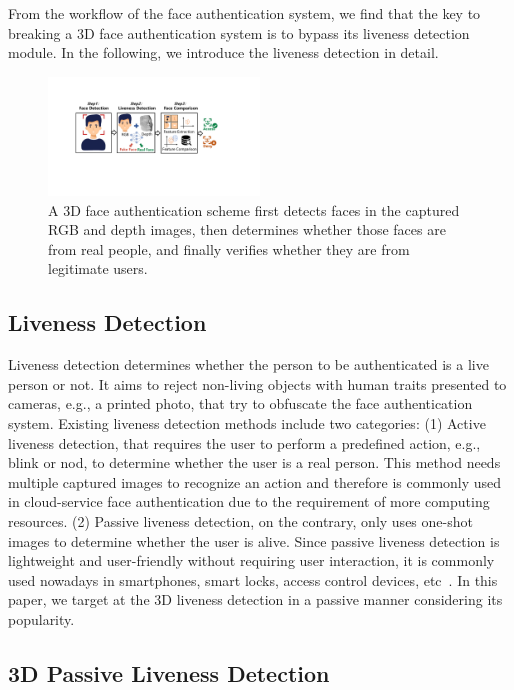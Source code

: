 From the workflow of the face authentication system, we find that the key to breaking a 3D face authentication system is to bypass its liveness detection module. In the following, we introduce the liveness detection in detail.

\begin{figure}[pt]
	\centerline{\includegraphics[width = 0.5\textwidth]{figures/face_auth_workflow.pdf}}
	\vspace{-0.15in}
	\caption{A 3D face authentication scheme first detects faces in the captured RGB and depth images, then determines whether those faces are from real people, and finally verifies whether they are from legitimate users.}
	\label{fas_workflow}
	\vspace{-0.15in}
\end{figure}

\subsection{Liveness Detection}
Liveness detection determines whether the person to be authenticated is a live person or not. 
It aims to reject non-living objects with human traits presented to cameras, e.g., a printed photo, that try to obfuscate the face authentication system. 
Existing liveness detection methods include two categories: 
(1) Active liveness detection, that requires the user to perform a predefined action, e.g., blink or nod, to determine whether the user is a real person. This method needs multiple captured images to recognize an action and therefore is commonly used in cloud-service face authentication due to the requirement of more computing resources. 
(2) Passive liveness detection, on the contrary, only uses one-shot images to determine whether the user is alive. 
Since passive liveness detection is lightweight and user-friendly without  requiring user interaction, it is commonly used nowadays in smartphones, smart locks, access control devices, etc~\cite{chakraborty2014overview}.  In this paper, we target at the 3D liveness detection in a passive manner considering its popularity. 

\subsection{3D Passive Liveness Detection}

